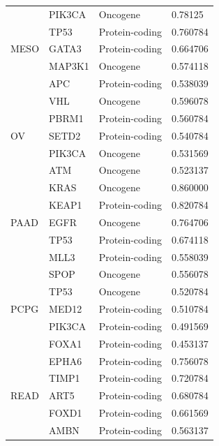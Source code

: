 \begin{table}
\begin{center}
{\begin{tabular}{l|l|l|l}
        \midrule
        \multirow{5}{*}{MESO} & PIK3CA & Oncogene & 0.78125 \\ %
        & TP53 & Protein-coding & 0.760784 \\ %
        & GATA3  & Protein-coding & 0.664706 \\ %
        & MAP3K1  & Oncogene & 0.574118 \\ %
        & APC   & Protein-coding & 0.538039 \\ 
        \midrule
        \multirow{5}{*}{OV} & VHL & Oncogene & 0.596078 \\ %
        & PBRM1 & Protein-coding  & 0.560784 \\ %
        & SETD2 & Protein-coding & 0.540784 \\ %
        & PIK3CA & Oncogene & 0.531569 \\ %
        & ATM & Oncogene & 0.523137 \\ %
        \midrule
        \multirow{5}{*}{PAAD}& KRAS & Oncogene & 0.860000 \\ %
        & KEAP1 & Protein-coding & 0.820784 \\ %
        & EGFR & Oncogene & 0.764706 \\ %
        & TP53 & Protein-coding & 0.674118 \\ %
        & MLL3 & Protein-coding & 0.558039 \\ %
        \midrule
        \multirow{5}{*}{PCPG}& SPOP & Oncogene & 0.556078 \\ %
        & TP53 & Oncogene & 0.520784 \\ %
        & MED12 & Protein-coding & 0.510784 \\ %
        & PIK3CA & Protein-coding & 0.491569 \\ %
        & FOXA1 & Protein-coding & 0.453137 \\ %
        \midrule
        \multirow{5}{*}{READ}& EPHA6 & Protein-coding & 0.756078 \\ %
        & TIMP1 & Protein-coding & 0.720784 \\ %
        & ART5 & Protein-coding & 0.680784 \\ %
        & FOXD1 & Protein-coding & 0.661569 \\ %
        & AMBN & Protein-coding & 0.563137 \\ %

\end{tabular}}
\end{center}
\end{table}
